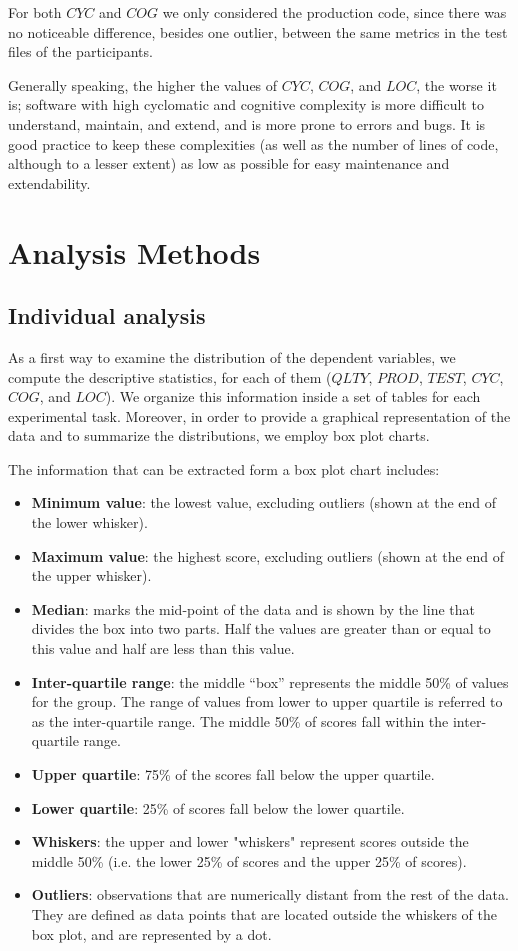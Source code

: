 For both $CYC$ and $COG$ we only considered the production code, since there was no noticeable difference, besides one outlier, between the same metrics in the test files of the participants.

Generally speaking, the higher the values of $CYC$, $COG$, and $LOC$, the worse it is; software with high cyclomatic and cognitive complexity is more difficult to understand, maintain, and extend, and is more prone to errors and bugs. It is good practice to keep these complexities (as well as the number of lines of code, although to a lesser extent) as low as possible for easy maintenance and extendability.


\section{Analysis Methods}
\subsection{Individual analysis}
As a first way to examine the distribution of the dependent variables, we compute the descriptive statistics, for each of them (\ie $QLTY$, $PROD$, $TEST$, $CYC$, $COG$, and $LOC$). We organize this information inside a set of tables for each experimental task. Moreover, in order to provide a graphical representation of the data and to summarize the distributions, we employ box plot charts.

The information that can be extracted form a box plot chart includes:
\begin{itemize}
    \item \textbf{Minimum value}: the lowest value, excluding outliers (shown at the end of the lower whisker).
    \item \textbf{Maximum value}: the highest score, excluding outliers (shown at the end of the upper whisker).
    \item \textbf{Median}: marks the mid-point of the data and is shown by the line that divides the box into two parts. Half the values are greater than or equal to this value and half are less than this value.
    \item \textbf{Inter-quartile range}: the middle “box” represents the middle 50\% of values for the group. The range of values from lower to upper quartile is referred to as the inter-quartile range. The middle 50\% of scores fall within the inter-quartile range.
    \item \textbf{Upper quartile}: 75\% of the scores fall below the upper quartile.
    \item \textbf{Lower quartile}: 25\% of scores fall below the lower quartile.
    \item \textbf{Whiskers}: the upper and lower "whiskers" represent scores outside the middle 50\% (i.e. the lower 25\% of scores and the upper 25\% of scores).
    \item \textbf{Outliers}: observations that are numerically distant from the rest of the data. They are defined as data points that are located outside the whiskers of the box plot, and are represented by a dot.
\end{itemize}

